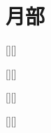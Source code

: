\chapter{月部}

\begin{Lemma} %
	\centry[][]{}[][]{\SP{}}{\SP{}}
	\pro{}\lipsum
	\begin{mainenum}
		\mitem  \en{}
		\E{\e \e \e }
		\mitem  \en{}
		\E{\e \e \e }
		\mitem  \en{}
		\E{\e \e \e }
	\end{mainenum}
\end{Lemma}

\begin{Lemma} %
	\centry[][]{}[][]{\SP{}}{\SP{}}
	\pro{}\lipsum
	\begin{mainenum}
		\mitem  \en{}
		\E{\e \e \e }
		\mitem  \en{}
		\E{\e \e \e }
		\mitem  \en{}
		\E{\e \e \e }
	\end{mainenum}
\end{Lemma}

\begin{Lemma} %
	\centry[][]{}[][]{\SP{}}{\SP{}}
	\pro{}\lipsum
	\begin{mainenum}
		\mitem  \en{}
		\E{\e \e \e }
		\mitem  \en{}
		\E{\e \e \e }
		\mitem  \en{}
		\E{\e \e \e }
	\end{mainenum}
\end{Lemma}

\begin{Lemma} %
	\centry[][]{}[][]{\SP{}}{\SP{}}
	\pro{}\lipsum
	\begin{mainenum}
		\mitem  \en{}
		\E{\e \e \e }
		\mitem  \en{}
		\E{\e \e \e }
		\mitem  \en{}
		\E{\e \e \e }
	\end{mainenum}
\end{Lemma}

